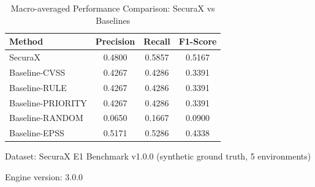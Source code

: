\begin{table}[htbp]
\centering
\caption{Macro-averaged Performance Comparison: SecuraX vs Baselines}
\label{tab:macro_comparison}
\begin{tabular}{lccc}
\hline
\textbf{Method} & \textbf{Precision} & \textbf{Recall} & \textbf{F1-Score} \\
\hline
SecuraX & 0.4800 & 0.5857 & 0.5167 \\
Baseline-CVSS & 0.4267 & 0.4286 & 0.3391 \\
Baseline-RULE & 0.4267 & 0.4286 & 0.3391 \\
Baseline-PRIORITY & 0.4267 & 0.4286 & 0.3391 \\
Baseline-RANDOM & 0.0650 & 0.1667 & 0.0900 \\
Baseline-EPSS & 0.5171 & 0.5286 & 0.4338 \\
\hline
\end{tabular}
\begin{tablenotes}
\small
\item Dataset: SecuraX E1 Benchmark v1.0.0 (synthetic ground truth, 5 environments)
\item Engine version: 3.0.0
\end{tablenotes}
\end{table}